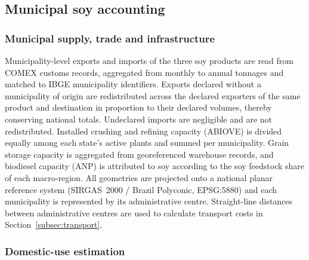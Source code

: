 \documentclass[pdflatex,sn-nature]{sn-jnl}%
\begin{document}
\subsection{Municipal soy accounting}\label{subsec:accounting}

\subsubsection{Municipal supply, trade and infrastructure}\label{subsubsec:assemble}
Municipality-level exports and imports of the three soy products are read from COMEX customs records, aggregated from monthly to annual tonnages and matched to IBGE municipality identifiers. Exports declared without a municipality of origin are redistributed across the declared exporters of the same product and destination in proportion to their declared volumes, thereby conserving national totals. Undeclared imports are negligible and are not redistributed. Installed crushing and refining capacity (ABIOVE) is divided equally among each state's active plants and summed per municipality. Grain storage capacity is aggregated from georeferenced warehouse records, and biodiesel capacity (ANP) is attributed to soy according to the soy feedstock share of each macro-region. All geometries are projected onto a national planar reference system (SIRGAS~2000 / Brazil Polyconic, EPSG:5880) and each municipality is represented by its administrative centre. Straight-line distances between administrative centres are used to calculate transport costs in Section~\ref{subsec:transport}.

\subsubsection{Domestic-use estimation}\label{subsubsec:domuse}
\end{document}

